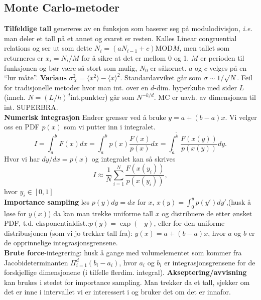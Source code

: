 \documentclass[12pt,a4paper,twocolumn]{article}
\begin{document}
\begin{flushleft}
\subsection{Monte Carlo-metoder} %
\label{sub:monte_carlo_metoder}
\textbf{Tilfeldige tall} genereres av en funksjon som baserer seg på modulodivisjon, \emph{i.e.} man deler et tall på et annet og svaret er resten. Kalles Linear congruential relations og ser ut som dette $N_i=(aN_{i-1}+c)$MOD$M$, men tallet som returneres er $x_i = N_i/M$ for å sikre at det er mellom 0 og 1. $M$ er perioden til funksjonen og bør være så stort som mulig, $N_0$ er såkornet. $a$ og $c$ velges på en ``lur måte''.
\textbf{Varians} $\sigma^2_X =  \langle x^2 \rangle - \langle x\rangle^2$. Standardavviket går som $\sigma \sim 1/\sqrt N$. Feil for tradisjonelle metoder hvor man int. over en $d$-dim. hyperkube med sider $L$ (inneh. $N = (L/h)^d$int.punkter) går som $N^{-k/d}$. MC er uavh. av dimensjonen til int. SUPERBRA.\\
\textbf{Numerisk integrasjon} Endrer grenser ved å bruke $y=a+(b-a)x$. Vi velger oss en PDF $p(x)$ som vi putter inn i integralet.
$$I=\int_a^b F(x) dx =\int_a^b p(x)\frac{F(x)}{p(x)} dx=\int_{\tilde{a}}^{\tilde{b}}\frac{F(x(y))}{p(x(y))} dy.$$
Hvor vi har $dy/dx=p(x)$ og integralet  kan så skrives
$$ I\approx  \frac{1}{N}\sum_{i=1}^N\frac{F(x(y_i))}{p(x(y_i))},$$
hvor $y_i\in[0,1]$\\
\textbf{Importance sampling} løs $p(y)dy=dx$ for $x$, $x(y) = \int_0^y p(y')dy'$,(husk å løse for $y(x)$) da kan man trekke uniforme tall $x$ og distribuere de etter ønsket PDF, t.d. eksponentialdist.:$p(y)=\exp(-y)$, eller for den uniforme distribusjonen (som vi jo trekker tall fra): $y(x) = a+(b-a)x$, hvor $a$ og $b$ er de opprinnelige integrasjonsgrensene.\\
\textbf{Brute force}-integrering: husk å gange med volumelementet som kommer fra Jacobideterminanten $\Pi_{i=1}^d(b_i-a_i)$, hvor $a_i$ og $b_i$ er integrasjonsgrensene for de forskjellige dimensjonene (i tilfelle flerdim. integral).
\textbf{Akseptering/avvisning} kan brukes i stedet for importance sampling. Man trekker da et tall, sjekker om det er inne i intervallet vi er interessert i og bruker det om det er innafor.


\end{flushleft}
\end{document}
